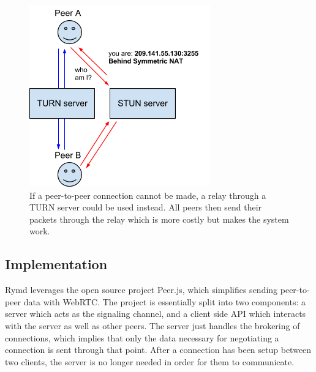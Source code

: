 \begin{figure}[htp]
\centering
\includegraphics[width=\textwidth,height=0.2\paperheight,keepaspectratio
]{figures/webrtc-turn}
\caption{If a peer-to-peer connection cannot be made, a relay through a TURN server could be used instead. All peers then send their packets through the relay which is more costly but makes the system work\cite{WebRTCArchitecture:2014:Online}.}
\label{fig:WebRTC - TURN}
\end{figure}

\subsection{Implementation}
\label{sec:p2p}

Rymd leverages the open source project Peer.js, which simplifies sending peer-to-peer data with WebRTC. The project is essentially split into two components: a server which acts as the signaling channel, and a client side API which interacts with the server as well as other peers. The server just handles the brokering of connections, which implies that only the data necessary for negotiating a connection is sent through that point. After a connection has been setup between two clients, the server is no longer needed in order for them to communicate. 

